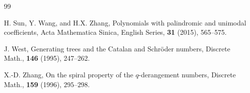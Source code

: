 \documentclass[12pt]{amsart}
\numberwithin{equation}{section}
\theoremstyle{plain}
\theoremstyle{definition}
\begin{document}
\begin{thebibliography}{99}

 H. Sun, Y. Wang, and H.X. Zhang, Polynomials with palindromic and unimodal coefficients, Acta Mathematica Sinica, English Series, {\bf 31} (2015), 565--575.



 J. West, Generating trees and the Catalan and Schr\"oder numbers, Discrete Math.,  {\bf 146} (1995), 247--262. 
  

X.-D. Zhang, On the spiral property of the $q$-derangement numbers, Discrete Math., {\bf159} (1996),  $295$--$298$. 

\end{thebibliography}
\end{document}
